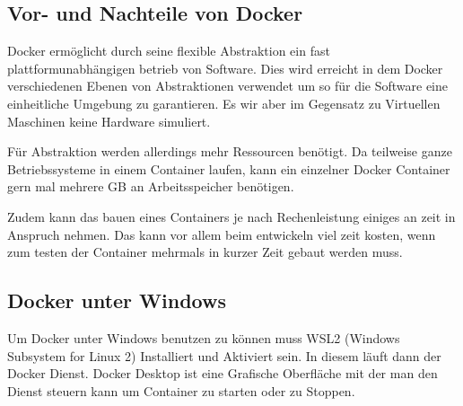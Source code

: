 \subsection{Vor- und Nachteile von Docker}
Docker ermöglicht durch seine flexible Abstraktion ein fast plattformunabhängigen betrieb von Software. Dies wird erreicht in dem Docker verschiedenen Ebenen von Abstraktionen verwendet um so für die Software eine einheitliche Umgebung zu garantieren. Es wir aber im Gegensatz zu Virtuellen Maschinen keine Hardware simuliert.


Für Abstraktion werden allerdings mehr Ressourcen benötigt. Da teilweise ganze Betriebssysteme in einem Container laufen, kann ein einzelner Docker Container gern mal mehrere GB an Arbeitsspeicher benötigen.

Zudem kann das bauen eines Containers je nach Rechenleistung einiges an zeit in Anspruch nehmen. Das kann vor allem beim entwickeln viel zeit kosten, wenn zum testen der Container mehrmals in kurzer Zeit gebaut werden muss.

\subsection{Docker unter Windows}
Um Docker unter Windows benutzen zu können muss WSL2 (Windows Subsystem for Linux 2) Installiert und Aktiviert sein.
In diesem läuft dann der Docker Dienst. Docker Desktop ist eine Grafische Oberfläche mit der man den Dienst steuern kann um Container zu starten oder zu Stoppen.